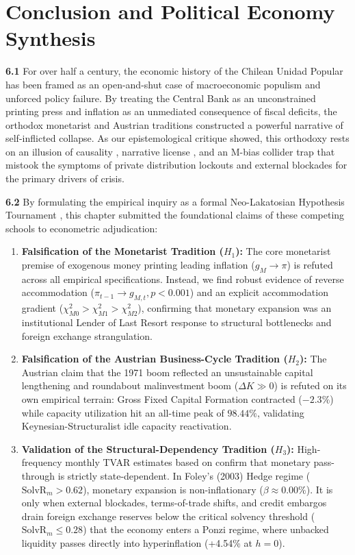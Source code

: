 \section{Conclusion and Political Economy Synthesis}
\label{sec:conclusion}

\textbf{6.1} For over half a century, the economic history of the Chilean Unidad Popular has been framed as an open-and-shut case of macroeconomic populism and unforced policy failure. By treating the Central Bank as an unconstrained printing press and inflation as an unmediated consequence of fiscal deficits, the orthodox monetarist and Austrian traditions \citep{Edwards2024,EspinosaVejar2025} constructed a powerful narrative of self-inflicted collapse. As our epistemological critique showed, this orthodoxy rests on an illusion of causality \citep{BlancoMatute2018}, narrative license \citep{IschEtAl2026}, and an M-bias collider trap that mistook the symptoms of private distribution lockouts and external blockades for the primary drivers of crisis.

\textbf{6.2} By formulating the empirical inquiry as a formal Neo-Lakatosian Hypothesis Tournament \citep{KingSznajder2006}, this chapter submitted the foundational claims of these competing schools to econometric adjudication:
\begin{enumerate}[leftmargin=2em]
	\item \textbf{Falsification of the Monetarist Tradition ($H_1$):} The core monetarist premise of exogenous money printing leading inflation ($g_M \to \pi$) is refuted across all empirical specifications. Instead, we find robust evidence of reverse accommodation ($\pi_{t-1} \to g_{M,t}, p < 0.001$) and an explicit accommodation gradient ($\chi^2_{M0} > \chi^2_{M1} > \chi^2_{M2}$), confirming that monetary expansion was an institutional Lender of Last Resort response to structural bottlenecks and foreign exchange strangulation.
	\item \textbf{Falsification of the Austrian Business-Cycle Tradition ($H_2$):} The Austrian claim that the 1971 boom reflected an unsustainable capital lengthening and roundabout malinvestment boom ($\Delta K \gg 0$) is refuted on its own empirical terrain: Gross Fixed Capital Formation contracted ($-2.3\%$) while capacity utilization hit an all-time peak of $98.44\%$, validating Keynesian-Structuralist idle capacity reactivation.
	\item \textbf{Validation of the Structural-Dependency Tradition ($H_3$):} High-frequency monthly TVAR estimates based on \citet{ClavijoCortesKappesRochon2025} confirm that monetary pass-through is strictly state-dependent. In Foley's (2003) Hedge regime ($\text{SolvR}_m > 0.62$), monetary expansion is non-inflationary ($\beta \approx 0.00\%$). It is only when external blockades, terms-of-trade shifts, and credit embargos drain foreign exchange reserves below the critical solvency threshold ($\text{SolvR}_m \le 0.28$) that the economy enters a Ponzi regime, where unbacked liquidity passes directly into hyperinflation (+4.54\% at $h=0$).
\end{enumerate}


